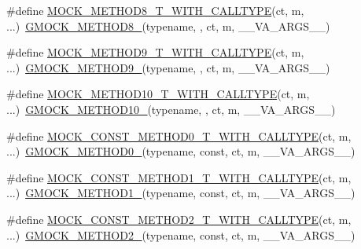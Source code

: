 \begin{DoxyCompactItemize}
\item 
\#define \hyperlink{gmock-generated-function-mockers_8h_a0cf1d3aba371dfe424d27b97b5473174}{M\+O\+C\+K\+\_\+\+M\+E\+T\+H\+O\+D8\+\_\+\+T\+\_\+\+W\+I\+T\+H\+\_\+\+C\+A\+L\+L\+T\+Y\+PE}(ct,  m, ...)~\hyperlink{gmock-generated-function-mockers_8h_aa84a36427c44505207b7cad5dec7ad67}{G\+M\+O\+C\+K\+\_\+\+M\+E\+T\+H\+O\+D8\+\_\+}(typename, , ct, m, \+\_\+\+\_\+\+V\+A\+\_\+\+A\+R\+G\+S\+\_\+\+\_\+)
\item 
\#define \hyperlink{gmock-generated-function-mockers_8h_ad1bd879e10bad098cf68c27c75f4be09}{M\+O\+C\+K\+\_\+\+M\+E\+T\+H\+O\+D9\+\_\+\+T\+\_\+\+W\+I\+T\+H\+\_\+\+C\+A\+L\+L\+T\+Y\+PE}(ct,  m, ...)~\hyperlink{gmock-generated-function-mockers_8h_aa820171a19cc587c247dbe05cbffc55f}{G\+M\+O\+C\+K\+\_\+\+M\+E\+T\+H\+O\+D9\+\_\+}(typename, , ct, m, \+\_\+\+\_\+\+V\+A\+\_\+\+A\+R\+G\+S\+\_\+\+\_\+)
\item 
\#define \hyperlink{gmock-generated-function-mockers_8h_ae0460a593b7868a5573117032d6d2e3e}{M\+O\+C\+K\+\_\+\+M\+E\+T\+H\+O\+D10\+\_\+\+T\+\_\+\+W\+I\+T\+H\+\_\+\+C\+A\+L\+L\+T\+Y\+PE}(ct,  m, ...)~\hyperlink{gmock-generated-function-mockers_8h_a81a48223a8771de36ef92ac6d56f6e81}{G\+M\+O\+C\+K\+\_\+\+M\+E\+T\+H\+O\+D10\+\_\+}(typename, , ct, m, \+\_\+\+\_\+\+V\+A\+\_\+\+A\+R\+G\+S\+\_\+\+\_\+)
\item 
\#define \hyperlink{gmock-generated-function-mockers_8h_a4d7f87bf059071344e3a80c7fd1b9051}{M\+O\+C\+K\+\_\+\+C\+O\+N\+S\+T\+\_\+\+M\+E\+T\+H\+O\+D0\+\_\+\+T\+\_\+\+W\+I\+T\+H\+\_\+\+C\+A\+L\+L\+T\+Y\+PE}(ct,  m, ...)~\hyperlink{gmock-generated-function-mockers_8h_ae0d290ffa58d7c624b2e3487ba1252f4}{G\+M\+O\+C\+K\+\_\+\+M\+E\+T\+H\+O\+D0\+\_\+}(typename, const, ct, m, \+\_\+\+\_\+\+V\+A\+\_\+\+A\+R\+G\+S\+\_\+\+\_\+)
\item 
\#define \hyperlink{gmock-generated-function-mockers_8h_a73aa181fb48e360fd18f1c2b7d9073b0}{M\+O\+C\+K\+\_\+\+C\+O\+N\+S\+T\+\_\+\+M\+E\+T\+H\+O\+D1\+\_\+\+T\+\_\+\+W\+I\+T\+H\+\_\+\+C\+A\+L\+L\+T\+Y\+PE}(ct,  m, ...)~\hyperlink{gmock-generated-function-mockers_8h_a1bc0012d62440dda77208dabdf4925c9}{G\+M\+O\+C\+K\+\_\+\+M\+E\+T\+H\+O\+D1\+\_\+}(typename, const, ct, m, \+\_\+\+\_\+\+V\+A\+\_\+\+A\+R\+G\+S\+\_\+\+\_\+)
\item 
\#define \hyperlink{gmock-generated-function-mockers_8h_a74512829feca879a8e11731f0442d7b7}{M\+O\+C\+K\+\_\+\+C\+O\+N\+S\+T\+\_\+\+M\+E\+T\+H\+O\+D2\+\_\+\+T\+\_\+\+W\+I\+T\+H\+\_\+\+C\+A\+L\+L\+T\+Y\+PE}(ct,  m, ...)~\hyperlink{gmock-generated-function-mockers_8h_a885295ca6bebb15efb3fc786218c5d47}{G\+M\+O\+C\+K\+\_\+\+M\+E\+T\+H\+O\+D2\+\_\+}(typename, const, ct, m, \+\_\+\+\_\+\+V\+A\+\_\+\+A\+R\+G\+S\+\_\+\+\_\+)

\end{DoxyCompactItemize}
